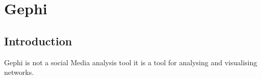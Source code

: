 \chapter{Gephi}
\section{Introduction}
Gephi is not a social Media analysis tool it is a tool for analysing and visualising networks.
